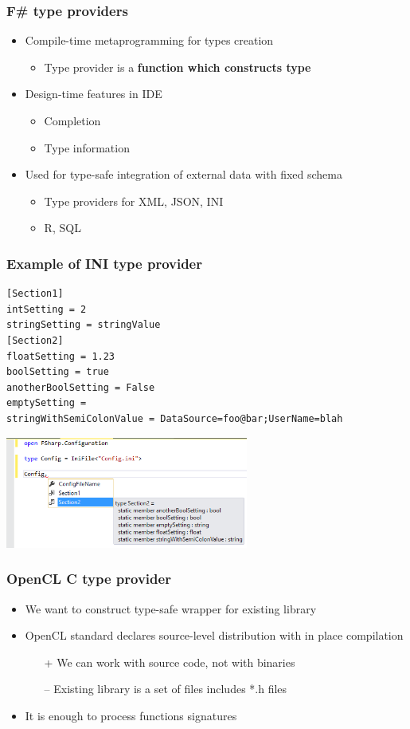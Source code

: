 \documentclass[xcolor=table]{beamer}
\begin{document}
\begin{frame}
  \transwipe[direction=90]
  \frametitle{F\# type providers}
\begin{itemize}
 \item Compile-time metaprogramming for types creation
 \begin{itemize}
  \item Type provider is a \textbf{function which constructs type}
 \end{itemize}
 \item Design-time features in IDE
 \begin{itemize}
   \item Completion
   \item Type information
 \end{itemize}
 \item Used for type-safe integration of external data with fixed schema
 \begin{itemize}
   \item Type providers for XML, JSON, INI
   \item R, SQL
 \end{itemize}
\end{itemize}

\end{frame}


\begin{frame}[fragile]
  \transwipe[direction=90]
  \frametitle{Example of INI type provider}

\small{
\begin{verbatim}
[Section1]
intSetting = 2
stringSetting = stringValue
[Section2]
floatSetting = 1.23
boolSetting = true
anotherBoolSetting = False
emptySetting =
stringWithSemiColonValue = DataSource=foo@bar;UserName=blah 
\end{verbatim}
}
\includegraphics[width=0.6\textwidth]{pictures/INIExample.png}

\end{frame}

\begin{frame}
  \transwipe[direction=90]
  \frametitle{OpenCL C type provider}
\begin{itemize}
\item We want to construct type-safe wrapper for existing library
\item OpenCL standard declares source-level distribution with in place compilation
\begin{itemize}
\item[+] We can work with source code, not with binaries
\item[--] Existing library is a set of files includes *.h files
\end{itemize}
\item It is enough to process functions signatures
\end{itemize}
\end{frame}
 
\end{document}
